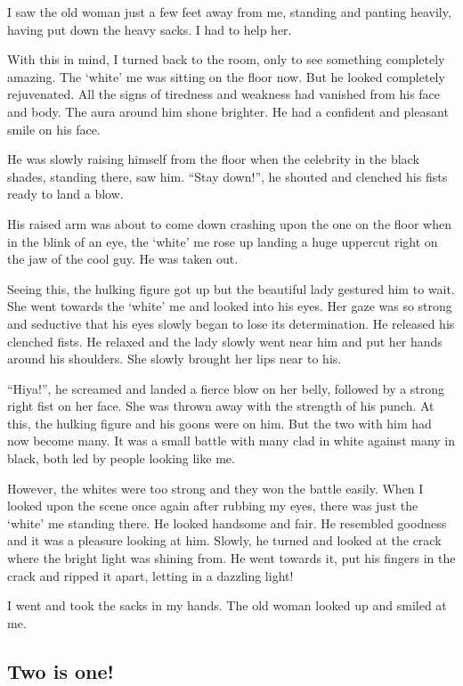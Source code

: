 \documentclass[twoside,11pt,titlepage]{article}
\begin{document}
I saw the old woman just a few feet away from me, standing and panting heavily, having put down the heavy sacks. I had to help her.

With this in mind, I turned back to the room, only to see something completely amazing. The `white' me was sitting on the floor now. But he looked completely rejuvenated. All the signs of tiredness and weakness had vanished from his face and body. The aura around him shone brighter. He had a confident and pleasant smile on his face.

He was slowly raising himself from the floor when the celebrity in the black shades, standing there, saw him. ``Stay down!'', he shouted and clenched his fists ready to land a blow.

His raised arm was about to come down crashing upon the one on the floor when in the blink of an eye, the `white' me rose up landing a huge uppercut right on the jaw of the cool guy. He was taken out.

Seeing this, the hulking figure got up but the beautiful lady gestured him to wait. She went towards the `white' me and looked into his eyes. Her gaze was so strong and seductive that his eyes slowly began to lose its determination. He released his clenched fists. He relaxed and the lady slowly went near him and put her hands around his shoulders. She slowly brought her lips near to his.

``Hiya!'', he screamed and landed a fierce blow on her belly, followed by a strong right fist on her face. She was thrown away with the strength of his punch. At this, the hulking figure and his goons were on him. But the two with him had now become many. It was a small battle with many clad in white against many in black, both led by people looking like me.

However, the whites were too strong and they won the battle easily. When I looked upon the scene once again after rubbing my eyes, there was just the `white' me standing there. He looked handsome and fair. He resembled goodness and it was a pleasure looking at him. Slowly, he turned and looked at the crack where the bright light was shining from. He went towards it, put his fingers in the crack and ripped it apart, letting in a dazzling light!

I went and took the sacks in my hands. The old woman looked up and smiled at me.
\newpage
\begin{center}
  \section{Two is one!}
\end{center}
\bigskip
\bigskip
\bigskip
\end{document}
